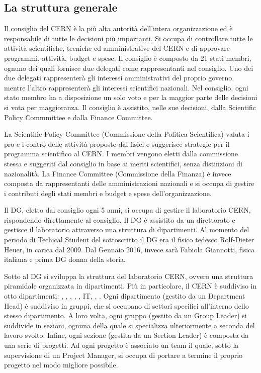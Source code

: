 		\subsection{La struttura generale} \label{subsec:C;l;struttura}
		
			Il consiglio del \ac{CERN} è la più alta autorità dell'intera organizzazione ed è responsabile di tutte le decisioni più importanti. Si occupa di controllare tutte le attività scientifiche, tecniche ed amministrative del \ac{CERN} e di approvare programmi, attività, budget e spese. Il consiglio è composto da 21 stati membri, ognuno dei quali fornisce due delegati come rappresentanti nel consiglio. Uno dei due delegati rappresenterà gli interessi amministrativi del proprio governo, mentre l'altro rappresenterà gli interessi scientifici nazionali. Nel consiglio, ogni stato membro ha a disposizione un solo voto e per la maggior parte delle decisioni si vota per maggioranza. Il consiglio è assistito, nelle sue decisioni, dalla Scientific Policy Commmittee e dalla Finance Committee.
			
			La Scientific Policy Committee (Commissione della Politica Scientifica) valuta i pro e i contro delle attività proposte dai fisici e suggerisce strategie per il programma scientifico al \ac{CERN}. I membri vengono eletti dalla commissione stessa e suggeriti dal consiglio in base ai meriti scientifici, senza distinzioni di nazionalità. La Finance Committee (Commissione della Finanza) è invece composta da rappresentanti delle amministrazioni nazionali e si occupa di gestire i contributi degli stati membri e budget e spese dell'organizzazione.
			
			Il \ac{DG}, eletto dal consiglio ogni 5 anni, si occupa di gestire il laboratorio \ac{CERN}, rispondendo direttamente al consiglio. Il \ac{DG} è assistito da un direttorato e gestisce il laboratorio attraverso una struttura di dipartimenti. Al momento del periodo di Techical Student del sottoscritto il \ac{DG} era il fisico tedesco Rolf-Dieter Heuer, in carica dal 2009. Dal Gennaio 2016, invece sarà Fabiola Giannotti, fisica italiana e prima \ac{DG} donna della storia.
			
			Sotto al \ac{DG} si sviluppa la struttura del laboratorio \ac{CERN}, ovvero una struttura piramidale organizzata in dipartimenti. Più in particolare, il \ac{CERN} è suddiviso in otto dipartimenti: , , , , , \ac{IT}, , . Ogni dipartimento (gestito da un Department Head) è suddiviso in gruppi, che si occupano di settori specifici all'interno dello stesso dipartimento. A loro volta, ogni gruppo (gestito da un Group Leader) si suddivide in sezioni, ognuna della quale si specializza ulteriormente a seconda del lavoro svolto. Infine, ogni sezione (gestita da un Section Leader) è composta da una serie di progetti. Ad ogni progetto è associato un team il quale, sotto la supervisione di un Project Manager, si occupa di portare a termine il proprio progetto nel modo migliore possibile. \cite{cern:structure}

